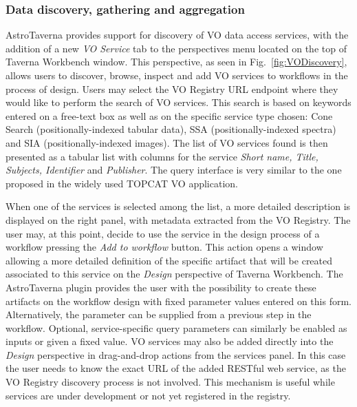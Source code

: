 \documentclass[final,authoryear,5p,times,twocolumn]{elsarticle}
\begin{document}
\subsubsection{Data discovery, gathering and aggregation}
\label{DataDiscovery}

AstroTaverna provides support for discovery of VO data access services, with the addition of a new \textit{VO Service} tab to the perspectives menu located on the top of Taverna Workbench window. This perspective, as seen in Fig.~\ref{fig:VODiscovery}, allows users to discover, browse, inspect and add VO services to workflows in the process of design. Users may select the VO Registry URL endpoint where they would like to perform the search of VO services. This search is based on keywords entered on a free-text box as well as on the specific service type chosen: Cone Search (positionally-indexed tabular data), SSA (positionally-indexed spectra) and SIA (positionally-indexed images). The list of VO services found is then presented as a tabular list with columns for the service \textit{Short name, Title, Subjects, Identifier} and \textit{Publisher}. The query interface is very similar to the one proposed in the widely used TOPCAT VO application. 

When one of the services is selected among the list, a more detailed description is displayed on the right panel, with metadata extracted from the VO Registry. The user may, at this point, decide to use the service in the design process of a workflow pressing the \textit{Add to workflow} button. This action opens a window allowing a more detailed definition of the specific artifact that will be created associated to this service on the \emph{Design} perspective of Taverna Workbench. The AstroTaverna plugin provides the user with the possibility to create these artifacts on the workflow design with fixed parameter values entered on this form. Alternatively, the parameter can be supplied from a previous step in the workflow. Optional, service-specific query parameters can similarly be enabled as inputs or given a fixed value. VO services may also be added directly into the \emph{Design} perspective in drag-and-drop actions from the services panel. In this case the user needs to know the exact URL of the added RESTful web service, as the VO Registry discovery process is not involved. This mechanism is useful while services are under development or not yet registered in the registry.
\end{document}
